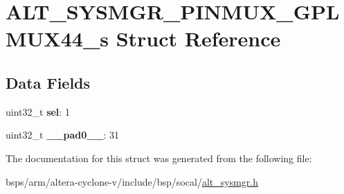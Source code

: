 \hypertarget{structALT__SYSMGR__PINMUX__GPLMUX44__s}{}\section{A\+L\+T\+\_\+\+S\+Y\+S\+M\+G\+R\+\_\+\+P\+I\+N\+M\+U\+X\+\_\+\+G\+P\+L\+M\+U\+X44\+\_\+s Struct Reference}
\label{structALT__SYSMGR__PINMUX__GPLMUX44__s}
\subsection*{Data Fields}
\begin{DoxyCompactItemize}
\item 
\mbox{\label{structALT__SYSMGR__PINMUX__GPLMUX44__s_a80fa760850a49d17258a3605bc1a0835}} 
uint32\+\_\+t {\bfseries sel}\+: 1
\item 
\mbox{\label{structALT__SYSMGR__PINMUX__GPLMUX44__s_a21b7cebd8501e8df29b5b8132679acca}} 
uint32\+\_\+t {\bfseries \+\_\+\+\_\+pad0\+\_\+\+\_\+}\+: 31
\end{DoxyCompactItemize}


The documentation for this struct was generated from the following file\+:\begin{DoxyCompactItemize}
\item 
bsps/arm/altera-\/cyclone-\/v/include/bsp/socal/\mbox{\hyperlink{alt__sysmgr_8h}{alt\+\_\+sysmgr.\+h}}\end{DoxyCompactItemize}
